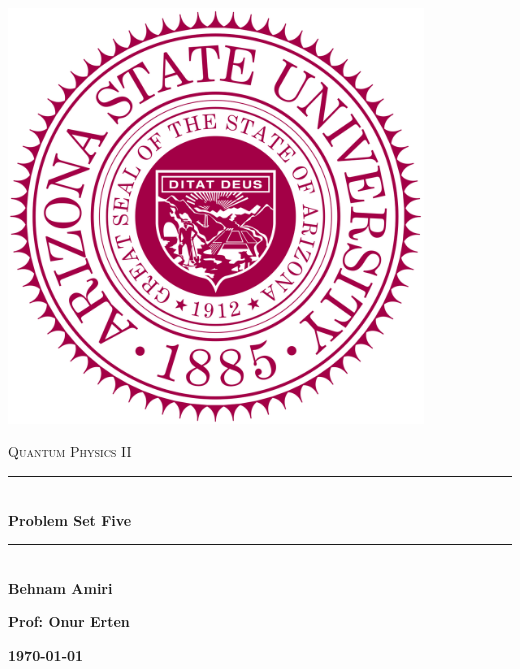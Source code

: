 \documentclass[fleqn]{article}
\begin{document}
  \begin{titlepage}

    \newcommand{\HRule}{\rule{\linewidth}{0.5mm}}

    \center

    \begin{center}
      \includegraphics[height=11cm, width=11cm]{asu.png}
    \end{center}

    \vline

    \textsc{\LARGE Quantum Physics II}\\[1.5cm]

    \HRule \\[0.5cm]
    { \huge \bfseries Problem Set Five}\\[0.4cm] 
    \HRule \\[1.0cm]

    \textbf{Behnam Amiri}

    \bigbreak

    \textbf{Prof: Onur Erten}

    \bigbreak

    \textbf{{\large \today}\\[2cm]}

    \vfill

  \end{titlepage}
\end{document}
